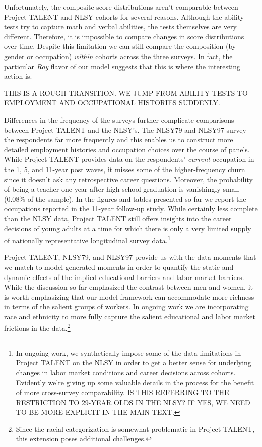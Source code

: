 \documentclass[onehalfspacing,11pt]{article}
\begin{document}
Unfortunately, the composite score distributions aren't comparable between Project TALENT and NLSY cohorts for several reasons. Although the ability tests try to capture math and verbal abilities, the tests themselves are very different. Therefore, it is impossible to compare changes in score distributions over time. Despite this limitation we can still compare the composition (by gender or occupation) {\it within} cohorts across the three surveys. In fact, the particular {\it Roy} flavor of our model suggests that this is where the interesting action is.

THIS IS A ROUGH TRANSITION. WE JUMP FROM ABILITY TESTS TO EMPLOYMENT AND OCCUPATIONAL HISTORIES SUDDENLY.

Differences in the frequency of the surveys further complicate comparisons between Project TALENT and the NLSY's. The NLSY79 and NLSY97 survey the respondents far more frequently and this enables us to construct more detailed employment histories and occupation choices over the course of panels. While Project TALENT provides data on the respondents' {\it current} occupation in the 1, 5, and 11-year post waves, it misses some of the higher-frequency churn since it doesn't ask any retrospective career questions. Moreover, the probability of being a teacher one year after high school graduation is vanishingly small (0.08\% of the sample). In the figures and tables presented so far we report the occupations reported in the 11-year follow-up study. While certainly less complete than the NLSY data, Project TALENT still offers insights into the career decisions of young adults at a time for which there is only a very limited supply of nationally representative longitudinal survey data.\footnote{In ongoing work, we synthetically impose some of the data limitations in Project TALENT on the NLSY in order to get a better sense for underlying changes in labor market conditions and career decisions across cohorts. Evidently we're giving up some valuable details in the process for the benefit of more cross-survey comparability. IS THIS REFERRING TO THE RESTRICTION TO 29-YEAR OLDS IN THE NLSY? IF YES, WE NEED TO BE MORE EXPLICIT IN THE MAIN TEXT.}

Project TALENT, NLSY79, and NLSY97 provide us with the data moments that we match to model-generated moments in order to quantify the static and dynamic effects of the implied educational barriers and labor market barriers. While the discussion so far emphasized the contrast between men and women, it is worth emphasizing that our model framework can accommodate more richness in terms of the salient groups of workers. In ongoing work we are incorporating race and ethnicity to more fully capture the salient educational and labor market frictions in the data.\footnote{Since the racial categorization is somewhat problematic in Project TALENT, this extension poses additional challenges.}
\end{document}
